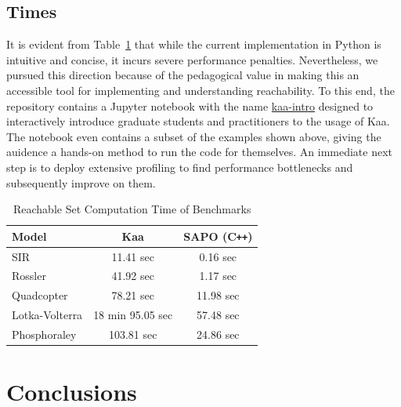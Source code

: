 \documentclass[EPiC]{easychair}
\begin{document}
\subsection{Times}

\noindent It is evident from Table~\ref{tab:one} that while the current implementation in Python is intuitive and concise, it incurs severe performance penalties. 
%
Nevertheless, we pursued this direction because of the pedagogical value in making this an accessible tool for implementing and understanding reachability. To this end, the repository contains a Jupyter notebook with the name \href{https://github.com/Tarheel-Formal-Methods/kaa/blob/master/kaa-intro.ipynb}{kaa-intro} designed to interactively introduce graduate students and practitioners to the usage of Kaa. The notebook even contains a subset of the examples shown above, giving the auidence a hands-on method to run the code for themselves. An immediate next step is to deploy extensive profiling to find performance bottlenecks and subsequently improve on them. 

\begin{table}[h]
\centering
\caption{Reachable Set Computation Time of Benchmarks}\label{tab:one}
\begin{tabular}{|l | c c|}
\hline
{\bf Model} &{\bf Kaa } & {\bf SAPO } (C\texttt{++})\\
\hline
SIR &  11.41 sec & 0.16 sec\\

Rossler &  41.92 sec & 1.17 sec\\

Quadcopter & 78.21 sec & 11.98 sec \\

Lotka-Volterra & 18 min 95.05 sec  & 57.48 sec\\
 
 Phosphoraley & 103.81 sec & 24.86 sec \\
\hline
\end{tabular}
\end{table}

\section{Conclusions}
\end{document}
